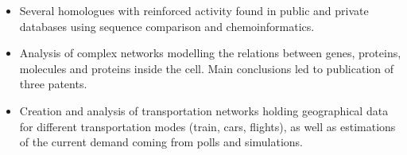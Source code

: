 \begin{itemize}
	\item Several homologues with reinforced activity found in public and private databases using sequence comparison and chemoinformatics.
\end{itemize}
\smallskip


\begin{itemize}
	\item Analysis of complex networks modelling the relations between genes, proteins, molecules and proteins inside the cell. Main conclusions led to publication of three patents.
\end{itemize}
\smallskip

\begin{itemize}
    \item Creation and analysis of transportation networks holding geographical data for different transportation modes (train, cars, flights), as well as estimations of the current demand coming from polls and simulations.
\end{itemize}
\smallskip

